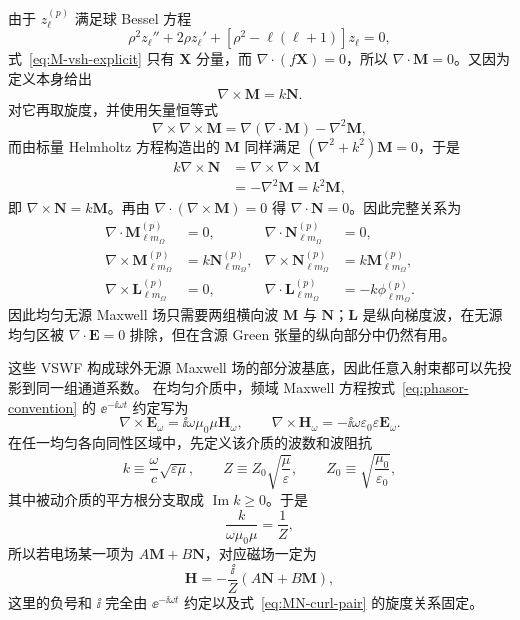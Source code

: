 由于 $z_\ell^{(p)}$ 满足球 Bessel 方程
\begin{equation}
\rho^2 z_\ell''+2\rho z_\ell'
+\left[\rho^2-\ell(\ell+1)\right]z_\ell=0,
\end{equation}
式~\eqref{eq:M-vsh-explicit} 只有 $\bm X$ 分量，而 $\nabla\cdot(f\bm X)=0$，所以 $\nabla\cdot\bm M=0$。又因为定义本身给出
\begin{equation}
\nabla\times\bm M=k\bm N.
\end{equation}
对它再取旋度，并使用矢量恒等式
\begin{equation}
\nabla\times\nabla\times\bm M
=\nabla(\nabla\cdot\bm M)-\nabla^2\bm M,
\end{equation}
而由标量 Helmholtz 方程构造出的 $\bm M$ 同样满足 $(\nabla^2+k^2)\bm M=0$，于是
\begin{align}
k\nabla\times\bm N
&=\nabla\times\nabla\times\bm M\\
&=-\nabla^2\bm M=k^2\bm M,
\end{align}
即 $\nabla\times\bm N=k\bm M$。再由 $\nabla\cdot(\nabla\times\bm M)=0$ 得 $\nabla\cdot\bm N=0$。因此完整关系为
\begin{align}
\nabla\cdot\bm M_{\ell m_{\Omega}}^{(p)}
&=0,
&
\nabla\cdot\bm N_{\ell m_{\Omega}}^{(p)}
&=0,
\\
\nabla\times\bm M_{\ell m_{\Omega}}^{(p)}
&=k\bm N_{\ell m_{\Omega}}^{(p)},
&
\nabla\times\bm N_{\ell m_{\Omega}}^{(p)}
&=k\bm M_{\ell m_{\Omega}}^{(p)},
\label{eq:MN-curl-pair}
\\
\nabla\times\bm L_{\ell m_{\Omega}}^{(p)}
&=0,
&
\nabla\cdot\bm L_{\ell m_{\Omega}}^{(p)}
&=-k\phi_{\ell m_{\Omega}}^{(p)}.
\end{align}
因此均匀无源 Maxwell 场只需要两组横向波
$\bm M$ 与 $\bm N$；$\bm L$ 是纵向梯度波，在无源均匀区被
$\nabla\cdot\bm E=0$ 排除，但在含源 Green 张量的纵向部分中仍然有用。

这些 VSWF 构成球外无源 Maxwell 场的部分波基底，因此任意入射束都可以先投影到同一组通道系数。
在均匀介质中，频域 Maxwell 方程按式~\eqref{eq:phasor-convention} 的
$\ee^{-\ii\omega t}$ 约定写为
\begin{equation}
\nabla\times\bm E_\omega=\ii\omega\mu_0\mu\bm H_\omega,
\qquad
\nabla\times\bm H_\omega=-\ii\omega\varepsilon_0\varepsilon\bm E_\omega.
\label{eq:frequency-maxwell-isotropic}
\end{equation}
在任一均匀各向同性区域中，先定义该介质的波数和波阻抗
\begin{equation}
 k\equiv\frac{\omega}{c}\sqrt{\varepsilon\mu},
 \qquad
 Z\equiv Z_0\sqrt{\frac{\mu}{\varepsilon}},
 \qquad
 Z_0\equiv\sqrt{\frac{\mu_0}{\varepsilon_0}},
 \label{eq:isotropic-k-Z-def}
\end{equation}
其中被动介质的平方根分支取成 $\operatorname{Im}k\ge0$。于是
\begin{equation}
\frac{k}{\omega\mu_0\mu}
=\frac{1}{Z},
\end{equation}
所以若电场某一项为 $A\bm M+B\bm N$，对应磁场一定为
\begin{equation}
\bm H
=-\frac{\ii}{Z}
\left(A\bm N+B\bm M\right),
\label{eq:H-from-E-MN}
\end{equation}
这里的负号和 $\ii$ 完全由 $\ee^{-\ii\omega t}$ 约定以及式~\eqref{eq:MN-curl-pair} 的旋度关系固定。


